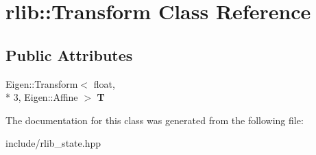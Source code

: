 \hypertarget{classrlib_1_1Transform}{\section{rlib\-:\-:Transform Class Reference}
\label{classrlib_1_1Transform}
}
\subsection*{Public Attributes}
\begin{DoxyCompactItemize}
\item 
\hypertarget{classrlib_1_1Transform_a38135d56804225fa5e1bac5a5c6b3d9d}{Eigen\-::\-Transform$<$ float, \\*
3, Eigen\-::\-Affine $>$ {\bfseries T}}\label{classrlib_1_1Transform_a38135d56804225fa5e1bac5a5c6b3d9d}

\end{DoxyCompactItemize}


The documentation for this class was generated from the following file\-:\begin{DoxyCompactItemize}
\item 
include/rlib\-\_\-state.\-hpp\end{DoxyCompactItemize}
